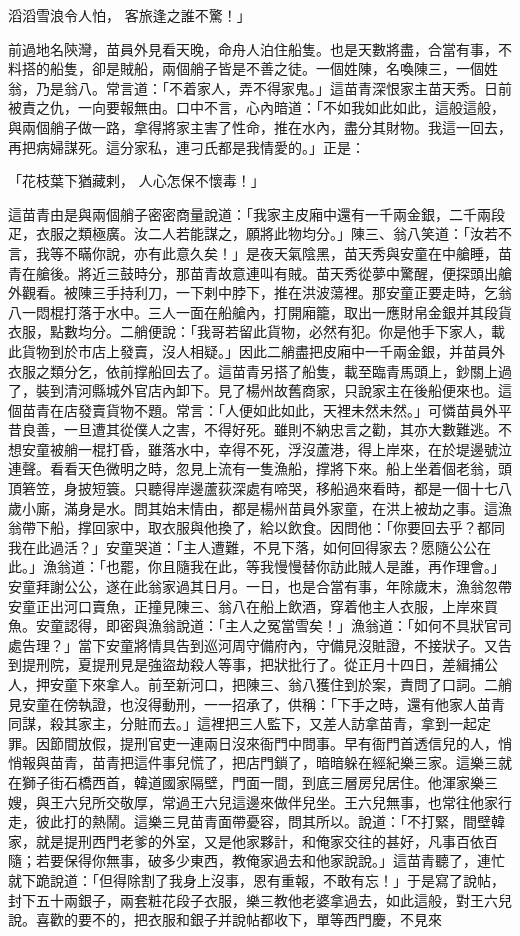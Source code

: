 滔滔雪浪令人怕，  客旅逢之誰不驚！」

前過地名陝灣，苗員外見看天晚，命舟人泊住船隻。也是天數將盡，合當有事，不料搭的船隻，卻是賊船，兩個艄子皆是不善之徒。一個姓陳，名喚陳三，一個姓翁，乃是翁八。常言道：「不着家人，弄不得家鬼。」這苗青深恨家主苗天秀。日前被責之仇，一向要報無由。口中不言，心內暗道：「不如我如此如此，這般這般，與兩個艄子做一路，拿得將家主害了性命，推在水內，盡分其財物。我這一回去，再把病婦謀死。這分家私，連刁氏都是我情愛的。」正是：

「花枝葉下猶藏剌，  人心怎保不懷毒！」

這苗青由是與兩個艄子密密商量說道：「我家主皮廂中還有一千兩金銀，二千兩段疋，衣服之類極廣。汝二人若能謀之，願將此物均分。」陳三、翁八笑道：「汝若不言，我等不瞞你說，亦有此意久矣！」是夜天氣陰黑，苗天秀與安童在中艙睡，苗青在艙後。將近三鼓時分，那苗青故意連叫有賊。苗天秀從夢中驚醒，便探頭出艙外觀看。被陳三手持利刀，一下剌中脖下，推在洪波蕩裡。那安童正要走時，乞翁八一悶棍打落于水中。三人一面在船艙內，打開廂籠，取出一應財帛金銀并其段貨衣服，點數均分。二艄便說：「我哥若留此貨物，必然有犯。你是他手下家人，載此貨物到於市店上發賣，沒人相疑。」因此二艄盡把皮廂中一千兩金銀，并苗員外衣服之類分乞，依前撑船回去了。這苗青另搭了船隻，載至臨青馬頭上，鈔關上過了，裝到清河縣城外官店內卸下。見了楊州故舊商家，只說家主在後船便來也。這個苗青在店發賣貨物不題。常言：「人便如此如此，天裡未然未然。」可憐苗員外平昔良善，一旦遭其從僕人之害，不得好死。雖則不納忠言之勸，其亦大數難逃。不想安童被艄一棍打昏，雖落水中，幸得不死，浮沒蘆港，得上岸來，在於堤邊號泣連聲。看看天色微明之時，忽見上流有一隻漁船，撑將下來。船上坐着個老翁，頭頂箬笠，身披短簑。只聽得岸邊蘆荻深處有啼哭，移船過來看時，都是一個十七八歲小廝，滿身是水。問其始末情由，都是楊州苗員外家童，在洪上被劫之事。這漁翁帶下船，撑回家中，取衣服與他換了，給以飲食。因問他：「你要回去乎？都同我在此過活？」安童哭道：「主人遭難，不見下落，如何回得家去？愿隨公公在此。」漁翁道：「也罷，你且隨我在此，等我慢慢替你訪此賊人是誰，再作理會。」安童拜謝公公，遂在此翁家過其日月。一日，也是合當有事，年除歲末，漁翁忽帶安童正出河口賣魚，正撞見陳三、翁八在船上飲酒，穿着他主人衣服，上岸來買魚。安童認得，即密與漁翁說道：「主人之冤當雪矣！」漁翁道：「如何不具狀官司處告理？」當下安童將情具告到巡河周守備府內，守備見沒賍證，不接狀子。又告到提刑院，夏提刑見是強盜劫殺人等事，把狀批行了。從正月十四日，差緝捕公人，押安童下來拿人。前至新河口，把陳三、翁八獲住到於案，責問了口詞。二艄見安童在傍執證，也沒得動刑，一一招承了，供稱：「下手之時，還有他家人苗青同謀，殺其家主，分賍而去。」這裡把三人監下，又差人訪拿苗青，拿到一起定罪。因節間放假，提刑官吏一連兩日沒來衙門中問事。早有衙門首透信兒的人，悄悄報與苗青，苗青把這件事兒慌了，把店門鎖了，暗暗躲在經紀樂三家。這樂三就在獅子街石橋西首，韓道國家隔壁，門面一間，到底三層房兒居住。他渾家樂三嫂，與王六兒所交敬厚，常過王六兒這邊來做伴兒坐。王六兒無事，也常往他家行走，彼此打的熱鬧。這樂三見苗青面帶憂容，問其所以。說道：「不打緊，間壁韓家，就是提刑西門老爹的外室，又是他家夥計，和俺家交往的甚好，凡事百依百隨；若要保得你無事，破多少東西，教俺家過去和他家說說。」這苗青聽了，連忙就下跪說道：「但得除割了我身上沒事，恩有重報，不敢有忘！」于是寫了說帖，封下五十兩銀子，兩套粧花段子衣服，樂三教他老婆拿過去，如此這般，對王六兒說。喜歡的要不的，把衣服和銀子并說帖都收下，單等西門慶，不見來
